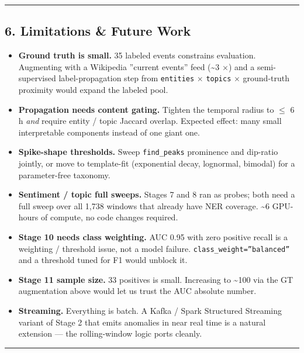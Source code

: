 \documentclass[
]{article}
\begin{document}
\begin{center}\rule{0.5\linewidth}{0.5pt}\end{center}

\subsection{6. Limitations \& Future
Work}\label{6-limitations--future-work}

\begin{itemize}
\item
  \textbf{Ground truth is small.} 35 labeled events constrains
  evaluation. Augmenting with a Wikipedia ''current events'' feed
  (\textasciitilde3 $\times$) and a semi-supervised label-propagation step from
  \texttt{entities} $\times$ \texttt{topics} $\times$ ground-truth proximity would
  expand the labeled pool.
\item
  \textbf{Propagation needs content gating.} Tighten the temporal radius
  to $\leq$ 6 h \emph{and} require entity / topic Jaccard overlap. Expected
  effect: many small interpretable components instead of one giant one.
\item
  \textbf{Spike-shape thresholds.} Sweep \texttt{find\_peaks} prominence
  and dip-ratio jointly, or move to template-fit (exponential decay,
  lognormal, bimodal) for a parameter-free taxonomy.
\item
  \textbf{Sentiment / topic full sweeps.} Stages 7 and 8 ran as probes;
  both need a full sweep over all 1,738 windows that already have NER
  coverage. \textasciitilde6 GPU-hours of compute, no code changes
  required.
\item
  \textbf{Stage 10 needs class weighting.} AUC 0.95 with zero positive
  recall is a weighting / threshold issue, not a model failure.
  \texttt{class\_weight=''balanced''} and a threshold tuned for F1 would
  unblock it.
\item
  \textbf{Stage 11 sample size.} 33 positives is small. Increasing to
  \textasciitilde100 via the GT augmentation above would let us trust
  the AUC absolute number.
\item
  \textbf{Streaming.} Everything is batch. A Kafka / Spark Structured
  Streaming variant of Stage 2 that emits anomalies in near real time is
  a natural extension --- the rolling-window logic ports cleanly.
\end{itemize}

\begin{center}\rule{0.5\linewidth}{0.5pt}\end{center}
\end{document}
